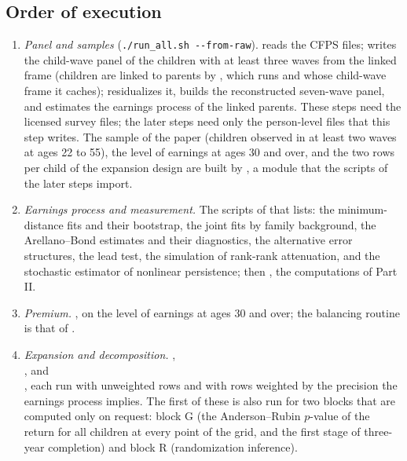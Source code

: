 \subsection{Order of execution}

\begin{enumerate}
\item \emph{Panel and samples} (\texttt{./run\_all.sh -{}-from-raw}).  reads the CFPS
files;  writes the child-wave panel of the children with at least three waves from the linked frame (children are linked to parents by , which  runs and whose child-wave frame it caches);
 residualizes it,  builds the reconstructed seven-wave panel, and  estimates the earnings process of the linked parents.
These steps need the licensed survey files; the later steps need only the person-level files that this step writes. The sample of the paper (children observed in at least two waves at ages 22 to 55), the level of earnings at ages 30 and over, and the two rows per child of the expansion design are built by , a module that the scripts of the later steps import.
\item \emph{Earnings process and measurement.} The scripts of  that  lists: the minimum-distance fits and their bootstrap, the joint fits by family background, the Arellano--Bond estimates and their diagnostics, the alternative error structures, the lead test, the simulation of rank-rank attenuation, and the stochastic estimator of nonlinear persistence; then , the computations of Part II.
\item \emph{Premium.}
, on the level of earnings at ages 30 and over; the balancing routine is that of
.
\item \emph{Expansion and decomposition.}
,\\
, and\\
, each run with unweighted rows and with rows weighted by the precision the earnings process implies. The first of these is also run for two blocks that are computed only on request: block G (the Anderson--Rubin $p$-value of the return for all children at every point of the grid, and the first stage of three-year completion) and block R (randomization inference).

\end{enumerate}

